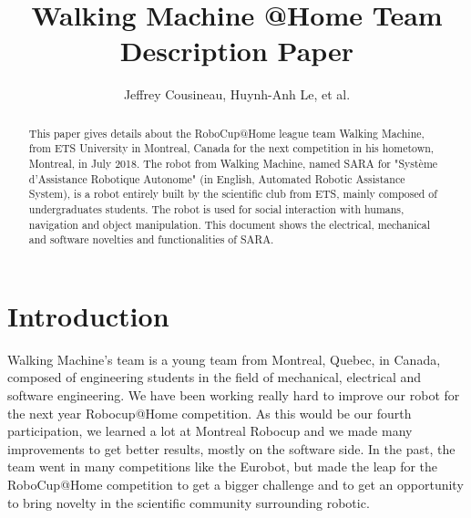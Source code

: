 \documentclass[runningheads,a4paper]{llncs}
\begin{document}
\newif\ifdraft
\draftfalse


\ifdraft
\setlength{\belowcaptionskip}{-5pt}
\fi

\title{Walking Machine @Home \newline {} Team Description Paper}

\author{Jeffrey Cousineau, Huynh-Anh Le, et al.}
\maketitle



\begin{abstract}

This paper gives details about the RoboCup@Home league team Walking Machine, from ETS University in Montreal, Canada for the next competition in his hometown, Montreal, in July 2018. The robot from Walking Machine, named SARA for "Système d’Assistance Robotique Autonome" (in English, Automated Robotic Assistance System), is a robot entirely built by the scientific club from ETS, mainly composed of undergraduates students. The robot is used for social interaction with humans, navigation and object manipulation. This document shows the electrical, mechanical and software novelties and functionalities of SARA.
\end{abstract}


\section{Introduction}
\tab Walking Machine’s team is a young team from Montreal, Quebec, in Canada, composed of engineering students in the field of mechanical, electrical and software engineering. We have been working really hard to improve our robot for the next year Robocup@Home competition. As this would be our fourth participation, we learned a lot at Montreal Robocup and we made many improvements to get better results, mostly on the software side. In the past, the team went in many competitions like the Eurobot, but made the leap for the RoboCup@Home competition to get a bigger challenge and to get an opportunity to bring novelty in the scientific community surrounding robotic. \\
\end{document}
